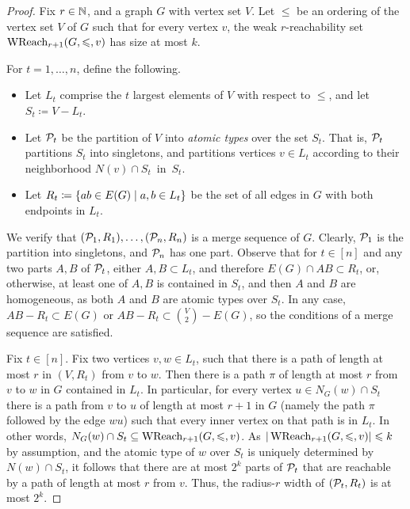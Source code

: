 \begin{proof}Fix $r\in\N$, and a graph $G$ with vertex set $V$.
Let $\le$ be an ordering of the vertex set $V$ of $G$ 
such that for every vertex \(v\), the weak $r$-reachability set $\wreach_{r+1}(G,\le,v)$ has size at most $k$.

For $t=1,\ldots,n$, define the following.
\begin{itemize}
  \item Let $L_t$ comprise the $t$ largest elements of $V$ with respect to $\le$, and let $S_t\coloneqq V-L_t$.
  \item Let  $\cal P_t$ be the partition of $V$ into \emph{atomic types}
  over the set $S_t$. That is, $\cal P_t$ partitions $S_t$ into singletons, and partitions vertices  $v\in L_t$ according to their neighborhood $N(v)\cap S_t$~in~$S_t$.
  \item Let $R_t \coloneqq\setof{ab\in E(G)}{a,b\in L_t}$ be the set of all edges in $G$ with both endpoints in $L_t$.
\end{itemize}
We verify that $(\cal P_1,R_1),\ldots,(\cal P_n,R_n)$ is a merge sequence of $G$. Clearly, $\cal P_1$ is the partition into singletons, 
and $\cal P_n$ has one part.
Observe that for $t\in[n]$ and any two parts $A,B$ of $\cal P_t$,
either $A,B\subset L_t$, and therefore  $E(G)\cap AB\subset R_t$,
or, otherwise, at least one of $A,B$ is contained in $S_t$, and then $A$ and $B$ are homogeneous,
as both $A$ and  $B$ are atomic types over $S_t$. 
In any case, $AB-R_t\subset E(G)$ or 
$AB-R_t\subset {V\choose 2}-E(G)$, so the conditions of a merge sequence are satisfied.


Fix $t\in[n]$. Fix two vertices $v,w\in L_t$, such that 
there is a path of length at most $r$ in $(V,R_t)$ from $v$ to $w$.
Then there is a path $\pi$ of length at most \(r\) from $v$ to $w$ in $G$
contained in $L_t$.
In particular, for every vertex $u\in N_G(w)\cap S_t$ 
there is a path from $v$ to $u$ of length at most $r+1$ in \(G\) (namely the path $\pi$ followed by the edge $wu$) such that every inner vertex on that path is in $L_t$.
In other words, $N_G(w)\cap S_t \subseteq \wreach_{r+1}(G,\le,v)$.
 As $|\wreach_{r+1}(G,\le,v)|\le k$ by assumption, and 
 the atomic type of $w$ over $S_t$ is uniquely 
determined by $N(w)\cap S_t$, it follows that 
there are at most $2^k$ parts of $\cal P_t$ 
that are reachable by a path of length at most $r$ from $v$.
Thus, the radius-$r$ width of $(\cal P_t,R_t)$ is at most
$2^k$.




\end{proof}

